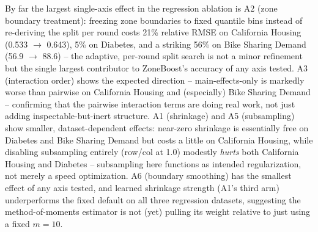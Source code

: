 \documentclass[11pt]{article}
\begin{document}
By far the largest single-axis effect in the regression ablation is A2
(zone boundary treatment): freezing zone boundaries to fixed quantile bins
instead of re-deriving the split per round costs 21\% relative RMSE on
California Housing (0.533 $\to$ 0.643), 5\% on Diabetes, and a striking
56\% on Bike Sharing Demand (56.9 $\to$ 88.6) -- the adaptive, per-round
split search is not a minor refinement but the single largest contributor
to ZoneBoost's accuracy of any axis tested. A3 (interaction order) shows
the expected direction -- main-effects-only is markedly worse than pairwise
on California Housing and (especially) Bike Sharing Demand -- confirming
that the pairwise interaction terms are doing real work, not just adding
inspectable-but-inert structure. A1 (shrinkage) and A5 (subsampling) show
smaller, dataset-dependent effects: near-zero shrinkage is essentially free
on Diabetes and Bike Sharing Demand but costs a little on California
Housing, while disabling subsampling entirely (row/col at 1.0) modestly
\emph{hurts} both California Housing and Diabetes -- subsampling here
functions as intended regularization, not merely a speed optimization. A6
(boundary smoothing) has the smallest effect of any axis tested, and
learned shrinkage strength (A1's third arm) underperforms the fixed
default on all three regression datasets, suggesting the method-of-moments
estimator is not (yet) pulling its weight relative to just using a fixed
$m=10$.
\end{document}
